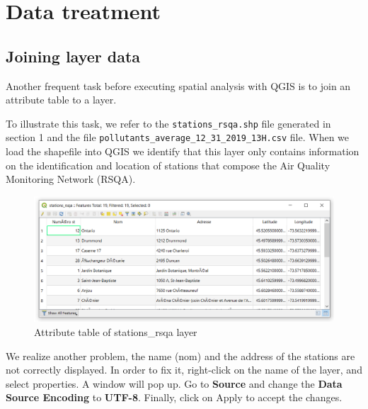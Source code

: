 \documentclass[]{book}
\theoremstyle{definition}
\theoremstyle{definition}
\theoremstyle{definition}
\theoremstyle{remark}
\begin{document}
\chapter{Data treatment}\label{data-treatment}

\section{Joining layer data}\label{joining-layer-data}

Another frequent task before executing spatial analysis with QGIS is to
join an attribute table to a layer.

To illustrate this task, we refer to the \texttt{stations\_rsqa.shp}
file generated in section 1 and the file
\texttt{pollutants\_average\_12\_31\_2019\_13H.csv} file. When we load
the shapefile into QGIS we identify that this layer only contains
information on the identification and location of stations that compose
the Air Quality Monitoring Network (RSQA).

\begin{figure}

{\centering \includegraphics[width=15.43in]{figures/Change_Encoding} 

}

\caption{Attribute table of stations_rsqa layer}\label{fig:unnamed-chunk-12}
\end{figure}

We realize another problem, the name (nom) and the address of the
stations are not correctly displayed. In order to fix it, right-click on
the name of the layer, and select properties. A window will pop up. Go
to \textbf{Source} and change the \textbf{Data Source Encoding} to
\textbf{UTF-8}. Finally, click on Apply to accept the changes.
\end{document}
